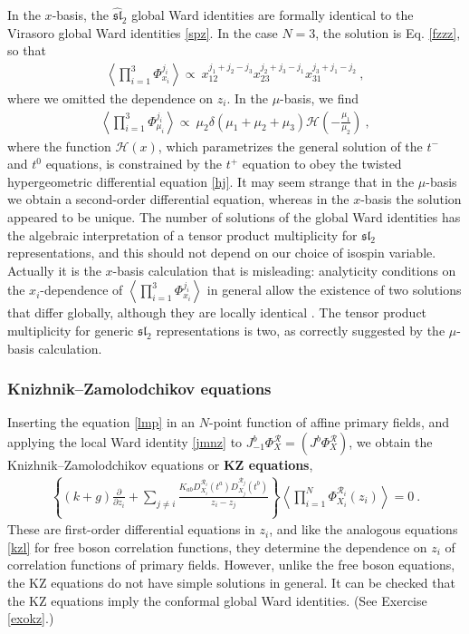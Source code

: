 \documentclass[12pt, a4paper, notitlepage, twoside]{report}
\numberwithin{equation}{section}
\theoremstyle{break}
\begin{document}
In the $x$-basis, the $\widehat{\mathfrak{sl}}_2$ global Ward identities are formally identical to the Virasoro global Ward identities \eqref{spz}. In the case $N=3$, the solution is Eq. \eqref{fzzz}, so that 
\begin{align}
 \left\langle \prod_{i=1}^3 \Phi^{j_i}_{x_i} \right\rangle \propto\ x_{12}^{j_1+j_2-j_3} x_{23}^{j_2+j_3-j_1} x_{31}^{j_3+j_1-j_2}\ ,
\label{xxx}
\end{align}
where we omitted the dependence on $z_i$.
In the $\mu$-basis, we find 
\begin{align}
 \left\langle \prod_{i=1}^3\Phi^{j_i}_{\mu_i}\right\rangle \propto\ \mu_2\delta(\mu_1+\mu_2+\mu_3) \mathcal{H}\left(-\frac{\mu_1}{\mu_2}\right)\ ,
\label{pmf}
\end{align}
where the function $\mathcal{H}(x)$, which parametrizes the general solution of the $t^-$ and $t^0$ equations, is constrained by the $t^+$ equation to obey the twisted hypergeometric differential equation \eqref{hj}.
It may seem strange that in the $\mu$-basis we obtain a second-order differential equation, whereas in the $x$-basis the solution appeared to be unique.
The number of solutions of the global Ward identities has the algebraic interpretation of a tensor product multiplicity for $\mathfrak{sl}_2$ representations, and this should not depend on our choice of isospin variable.
Actually it is the $x$-basis calculation that is misleading: analyticity conditions on the $x_i$-dependence of $\left\langle \prod_{i=1}^3 \Phi^{j_i}_{x_i} \right\rangle$ in general allow the existence of two solutions that differ globally, although they are locally identical \cite{rib09}.
The tensor product multiplicity for generic $\mathfrak{sl}_2$ representations is two, as correctly suggested by the $\mu$-basis calculation. 

\subsubsection{Knizhnik--Zamolodchikov equations}

Inserting the equation \eqref{lmp} in an $N$-point function of affine primary fields, and applying the local Ward identity \eqref{jmnz} to $J^b_{-1}\Phi^\mathcal{R}_X = (J^b\Phi^\mathcal{R}_X)$, we obtain the Knizhnik--Zamolodchikov equations or \textbf{\boldmath KZ equations},
\begin{align}
 \boxed{\left\{(k+g){\frac{\partial}{\partial z_i}} + \sum_{j\neq i} \frac{K_{ab}D_{X_i}^{\mathcal{R}_i}(t^a)D_{X_j}^{\mathcal{R}_j}(t^b)}{z_i-z_j}\right\}\left\langle \prod_{i=1}^N \Phi^{\mathcal{R}_i}_{X_i}(z_i)\right\rangle  = 0}\ .
\label{kz} 
\end{align}
These are first-order differential equations in $z_i$, and like the analogous equations \eqref{kzl} for free boson correlation functions, they determine the dependence on $z_i$ of correlation functions of primary fields.
However, unlike the free boson equations, the KZ equations do not have simple solutions in general. 
It can be checked that the KZ equations imply the conformal global Ward identities. (See Exercise \ref{exokz}.)
\end{document}
